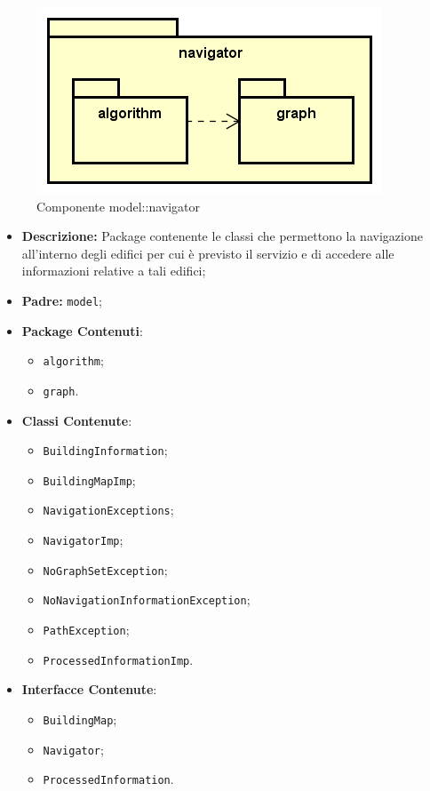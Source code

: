 \documentclass[../DefinizioneDiProdotto.tex]{subfiles}
\begin{document}
\begin{figure}[H]
	\centering
	\includegraphics[width=\maxwidth]{img/package/navigator.png}
	\caption{Componente model::\-navigator}\label{fig:model::navigator} 
\end{figure}
\begin{itemize}
	\item \textbf{Descrizione:} Package contenente le classi che permettono la navigazione all'interno degli edifici per cui è previsto il servizio e di accedere alle informazioni relative a tali edifici;
	\item \textbf{Padre:} \texttt{model};
	\item \textbf{Package Contenuti}:
	\begin{itemize}
		\item \texttt{algorithm};
		
		\item \texttt{graph}.
		
	\end{itemize}
	\item \textbf{Classi Contenute}:
	\begin{itemize}
		\item \texttt{BuildingInformation};
		
		\item \texttt{BuildingMapImp};
		
		\item \texttt{NavigationExceptions};
		
		\item \texttt{NavigatorImp};
		
		\item \texttt{NoGraphSetException};
		
		\item \texttt{NoNavigationInformationException};
		
		\item \texttt{PathException};
		
		\item \texttt{ProcessedInformationImp}.
		
	\end{itemize}
	\item \textbf{Interfacce Contenute}:
	\begin{itemize}
		\item \texttt{BuildingMap};
		
		\item \texttt{Navigator};
		
		\item \texttt{ProcessedInformation}.
		
	\end{itemize}
\end{itemize}
\end{document}
